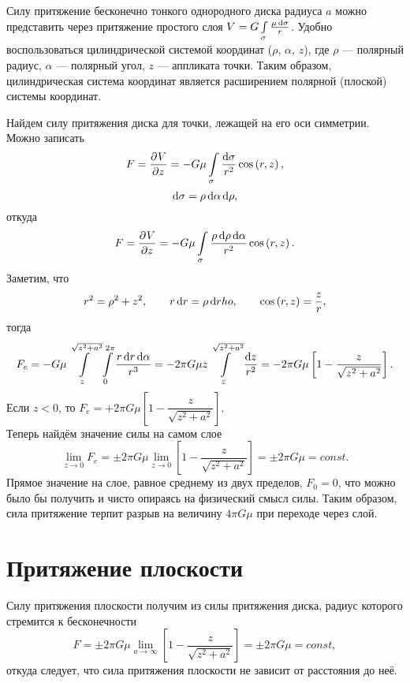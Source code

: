 \documentclass[11pt, a4paper]{article}
\theoremstyle{plain}
\theoremstyle{definition}
\theoremstyle{remark}
\begin{document}
Силу притяжение бесконечно тонкого однородного диска радиуса $a$ можно представить
через притяжение простого слоя $V = G\int\limits_{\sigma}\frac{\mu\dif\sigma}{r}$.
Удобно воспользоваться цилиндрической системой координат ($\rho$, $\alpha$, $z$), где $\rho$ ---
полярный радиус, $\alpha$ --- полярный угол, $z$ --- аппликата точки. Таким образом, цилиндрическая
система координат является расширением полярной (плоской) системы координат.

Найдем силу притяжения диска для точки, лежащей на его оси симметрии. Можно записать
\begin{equation*}
    F = \dpd{V}{z} = - G\mu\int\limits_{\sigma}\dfrac{\dif\sigma}{r^2}\cos\left( r, z \right),
\end{equation*}
\begin{equation*}
    \dif\sigma = \rho\dif\alpha\dif\rho,
\end{equation*}
откуда
\begin{equation*}
    F = \dpd{V}{z} = - G\mu\int\limits_{\sigma}\dfrac{\rho\dif\rho\dif\alpha}{r^2}\cos\left( r, z \right).
\end{equation*}
Заметим, что
\begin{equation*}
    r^2 = \rho^2 + z^2,\qquad r\dif r = \rho\dif rho,\qquad \cos\left( r, z \right) = \dfrac{z}{r},
\end{equation*}
тогда
\begin{equation*}
    F_e = - G\mu\int\limits_{z}^{\sqrt{z^2 + a^2}}\int\limits_{0}^{2\pi}\dfrac{r\dif
    r\dif\alpha}{r^3} = -2\pi G\mu z\int\limits_{z}^{\sqrt{z^2 + a^2}}\dfrac{\dif z}{r^2} =
    -2\pi G\mu\left[ 1 - \dfrac{z}{\sqrt{z^2 + a^2}}\right].
\end{equation*}
Если $z < 0$, то $F_e = +2\pi G\mu\left[ 1 - \dfrac{z}{\sqrt{z^2 + a^2}}\right]$. \\
Теперь найдём значение силы на самом слое
\begin{equation*}
    \lim\limits_{z\to 0} F_e = \pm2\pi G\mu\lim\limits_{z\to 0} \left[ 1 - \dfrac{z}{\sqrt{z^2 +
    a^2}}\right] = \pm2\pi G\mu = const.
\end{equation*}
Прямое значение на слое, равное среднему из двух пределов, $F_0 = 0$, что можно было бы получить и
чисто опираясь на физический смысл силы. Таким образом, сила притяжение
терпит разрыв на величину $4\pi G\mu$ при переходе через слой.

\section{Притяжение плоскости}
Силу притяжения плоскости получим из силы притяжения диска, радиус которого стремится к
бесконечности
\begin{equation*}
    F = \pm2\pi G\mu\lim\limits_{a\to\infty} \left[ 1 - \dfrac{z}{\sqrt{z^2 + a^2}}\right] =
    \pm2\pi G\mu = const,
\end{equation*}
откуда следует, что сила притяжения плоскости не зависит от расстояния до неё.
\end{document}
